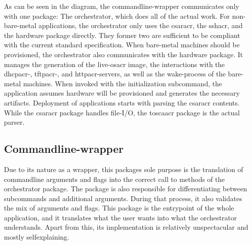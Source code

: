 As can be seen in the diagram, the commandline-wrapper communicates only with one package: The orchestrator, which does all of the actual work. For non-bare-metal applications, the orchestrator only uses the \gls{csaracr}, the \gls{sshacr}, and the hardware package directly. They former two are sufficient to be compliant with the current standard specification. When bare-metal machines should be provisioned, the orchestrator also communicates with the hardware package. It manages the generation of the live-\gls{osacr} image, the interactions with the \gls{dhcpacr}-, \gls{tftpacr}-, and \gls{httpacr}-servers, as well as the wake-process of the bare-metal machines.
\newline
When invoked with the initialization subcommand, the application assumes hardware will be provisioned and generates the necessary artifacts.
\newline
Deployment of applications starts with parsing the \gls{csaracr} contents. While the \gls{csaracr} package handles file-I/O, the \gls{toscaacr} package is the actual parser.

\subsection{Commandline-wrapper}
Due to its nature as a wrapper, this packages sole purpose is the translation of commandline arguments and flags into the correct call to methods of the orchestrator package. The package is also responsible for differentiating between subcommands and additional arguments. During that process, it also validates the mix of arguments and flags.
\newline
This package is the entrypoint of the whole application, and it translates what the user wants into what the orchestrator understands. Apart from this, its implementation is relatively unspectacular and mostly selfexplaining.

